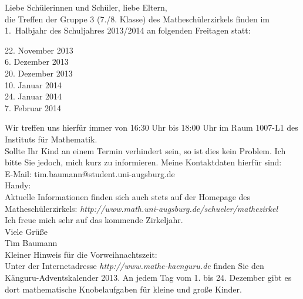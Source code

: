 \documentclass{infozettel}
\begin{document}
\renewcommand{\betreff}{Informationen zum Mathesch\"ulerzirkel der Universit\"at Augsburg\\ (7./8. Klasse -- Gruppe 3)}

\makeletterhead
Liebe Sch\"ulerinnen und Sch\"uler, liebe Eltern,\\[5pt]
die Treffen der Gruppe 3 (7./8. Klasse) des Mathesch\"ulerzirkels finden im 1.\ Halbjahr des Schuljahres 2013/2014 an folgenden Freitagen statt:
\begin{center}
22. November 2013\\
6. Dezember 2013\\
20. Dezember 2013\\
10. Januar 2014\\
24. Januar 2014\\
7. Februar 2014
\end{center}
Wir treffen uns hierf\"ur immer von 16:30 Uhr bis 18:00 Uhr im Raum 1007-L1 des Instituts f\"ur Mathematik.\\

Sollte Ihr Kind an 
einem Termin verhindert sein, so ist dies kein Problem. Ich bitte Sie jedoch, mich kurz zu informieren. Meine Kontaktdaten hierf\"ur sind:\\
E-Mail: tim.baumann@student.uni-augsburg.de\\
Handy: \\

Aktuelle Informationen finden sich auch stets auf der Homepage des Mathesch\"ulerzirkels:
\textsl{http:/\!/www.math.uni-augsburg.de/schueler/mathezirkel}\\

Ich freue mich sehr auf das kommende Zirkeljahr.\\
Viele Gr\"u\ss{}e\\[1.5cm]
Tim Baumann\\[1.1cm]


\footnotesize
Kleiner Hinweis f\"ur die Vorweihnachtszeit:\\
Unter der Internetadresse \textsl{http:/\!/www.mathe-kaenguru.de} finden Sie den K\"anguru-Adventskalender 2013. An jedem Tag vom 1. bis 24. Dezember 
gibt es dort mathematische Knobelaufgaben f\"ur kleine und gro\ss{}e Kinder. 
\end{document}
